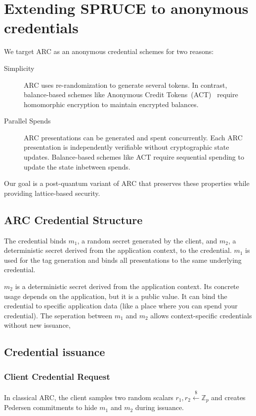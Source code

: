 \section{Extending SPRUCE to anonymous credentials}
\label{sec:anonymous-credentials}

We target ARC as an anonymous credential schemes for two reasons:
\begin{description}
    \item[Simplicity] ARC uses re-randomization to generate several tokens. In contrast, balance-based schemes like Anonymous Credit Tokens~(ACT)~\cite{schlesinger-cfrg-act-00} require homomorphic encryption to maintain encrypted balances. 
    \item[Parallel Spends] ARC presentations can be generated and spent concurrently. Each ARC presentation is independently verifiable without cryptographic state updates. Balance-based schemes like ACT require sequential spending to update the state inbetween spends. 
\end{description}

Our goal is a post-quantum variant of ARC that preserves these properties while providing lattice-based security.

\subsection{ARC Credential Structure}

The credential binds $m_1$, a random secret generated by the client, and $m_2$, a deterministic secret derived from the application context, to the credential. $m_1$ is used for the tag generation and binds all presentations to the same underlying credential. 

$m_2$ is a deterministic secret derived from the application context. Its concrete usage depends on the application, but it is a public value. It can bind the credential to specific application data (like a place where you can spend your credential). The seperation between $m_1$ and $m_2$ allows context-specific credentials without new issuance, 

\subsection{Credential issuance}

\subsubsection{Client Credential Request}
In classical ARC, the client samples two random scalars $r_1,r_2\xleftarrow{\$} \mathbb{Z}_p$  and creates Pedersen commitments to hide $m_1$ and $m_2$ during issuance. 

